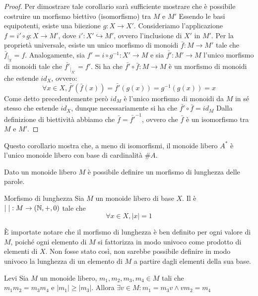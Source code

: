 \begin{proof}
  Per dimostrare tale corollario sarà sufficiente mostrare che è possibile costruire un morfismo biettivo (isomorfismo) tra \(M\) e \(M'\)
  Essendo le basi equipotenti, esiste una biiezione \(g: X \to X'\).
  Consideriamo l'applicazione \(f = i' \circ g : X \to M'\), dove \(i': X' \hookrightarrow M'\), ovvero l'inclusione di \(X'\) in \(M'\).
  Per la proprietà universale, esiste un unico morfismo di monoidi \(\bar{f}: M \to M'\) tale che \(\bar{f}_{|_X} = f\).
  Analogamente, sia \(f'= i \circ g^{-1} : X' \to M\) e sia \(\bar{f'}: M' \to M\) l'unico morfismo di monoidi tale che \(\bar{f'}_{|_{X'}} = f'\).
  Si ha che \(\bar{f'} \circ \bar{f}: M \to M\) è un morfismo di monoidi che estende \(id_X\), ovvero:
  \[\forall x \in X, \bar{f'} (\bar{f}(x)) = \bar{f'}(g(x))= g^{-1}(g(x))= x\]
  Come detto precedentemente però \(id_M\) è l'unico morfismo di monoidi da \(M\) in sé stesso che estende \(id_X\), dunque necessariamente si ha che \(\bar{f'} \circ \bar{f} = id_M\)
  Dalla definizione di biettività abbiamo che \(\bar{f} = \bar{f'}^{-1} \), ovvero che \(\bar{f}\) è un isomorfismo tra \(M\) e \(M'\). 
\end{proof}
Questo corollario mostra che, a meno di isomorfismi, il monoide libero \(A^*\) è l'unico monoide libero con base di cardinalità \(\#A\).

Dato un monoide libero \(M\) è possibile definire un morfismo di lunghezza delle parole.
\begin{definition}{Morfismo di lunghezza}
  Sia \(M\) un monoide libero di base \(X\).
  Il  è \(|\;|: M \to(\mathbb{N},+,0)\) tale che \[\forall x \in X, |x| = 1\]
\end{definition}

\begin{note}{}
  È importate notare che il morfismo di lunghezza è ben definito per ogni valore di \(M\), poiché ogni elemento di \(M\) si fattorizza in modo univoco come prodotto di elementi di \(X\).
  Non fosse stato così, non sarebbe possibile definire in modo univoco la lunghezza di un elemento di \(M\) a partire dagli elementi della sua base.
\end{note}

\begin{lemma}[label=lem:levi]{Levi}
  Sia \(M\) un monoide libero, \(m_1,m_2,m_3,m_4 \in M\) tali che \(m_1m_2=m_3m_4 \text{ e } |m_1| \geq |m_3|\).
  Allora \(\exists v \in M: m_1 = m_3v \land vm_2 = m_4\)
\end{lemma}


